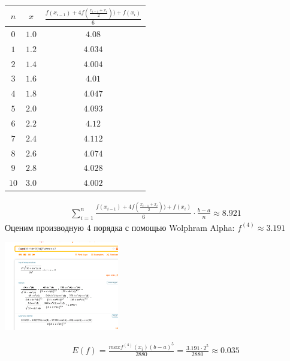 \documentclass[a4paper,11pt]{article}
\begin{document}
\begin{center}
	\begin{tabular}{|c|c|c|}
		\hline
		$ n $ & $ x $ & $ \frac{f(x_{i - 1}) + 4f(\frac{x_{i - 1} + x_i}2)) + f(x_i)}{6} $ \\[3pt]
		\hline
		$ 0 $  &   $ 1.0 $   &   $ 4.08 $     \\[2pt]
		\hline
		$ 1 $  &   $ 1.2 $   &   $ 4.034 $     \\[2pt]
		\hline
		$ 2 $  &   $ 1.4 $   &   $ 4.004 $     \\[2pt]
		\hline
		$ 3 $  &   $ 1.6 $   &   $ 4.01 $     \\[2pt]
		\hline
		$ 4 $  &   $ 1.8 $   &   $ 4.047 $     \\[2pt]
		\hline
		$ 5 $  &   $ 2.0 $   &   $ 4.093 $     \\[2pt]
		\hline
		$ 6 $  &   $ 2.2 $   &   $ 4.12 $     \\[2pt]
		\hline
		$ 7 $  &   $ 2.4 $   &   $ 4.112 $     \\[2pt]
		\hline
		$ 8 $  &   $ 2.6 $   &   $ 4.074 $     \\[2pt]
		\hline
		$ 9 $  &   $ 2.8 $   &   $ 4.028 $     \\[2pt]
		\hline
		$ 10 $  &   $ 3.0 $   &   $ 4.002 $     \\[2pt]
		\hline
	\end{tabular}
\end{center}
\begin{gather*}
\sum_{i = 1}^{n} \frac{f(x_{i - 1}) + 4f(\frac{x_{i - 1} + x_i}2)) + f(x_i)}{6} \cdot \frac{b - a}{n} \approx 8.921
\end{gather*}
Оценим производную 4 порядка с помощью Wolphram Alpha:
$ f^{(4)} \approx 3.191 $ \\
\begin{center}
	\includegraphics[width = 50mm]{images/261.png}
\end{center}
\begin{gather*}
E(f) = \frac{maxf^{(4)}(x_i)(b - a)^5}{2880}  = \frac{3.191 \cdot 2^5}{2880} \approx 0.035
\end{gather*}
\end{document}
